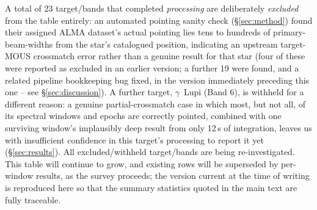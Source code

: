 \documentclass{openjournal}
\begin{document}
A total of 23 target/bands that completed \emph{processing} are
deliberately \emph{excluded} from the table entirely: an automated
pointing sanity check (\S\ref{sec:method}) found their assigned ALMA
dataset's actual pointing lies tens to hundreds of primary-beam-widths
from the star's catalogued position, indicating an upstream target-MOUS
crossmatch error rather than a genuine result for that star (four of
these were reported as excluded in an earlier version; a further 19
were found, and a related pipeline bookkeeping bug fixed, in the version
immediately preceding this one -- see \S\ref{sec:discussion}). A further
target, $\gamma$~Lupi (Band 6), is withheld for a different reason: a
genuine partial-crossmatch case in which most, but not all, of its
spectral windows and epochs are correctly pointed, combined with one
surviving window's implausibly deep result from only 12\,s of
integration, leaves us with insufficient confidence in this target's
processing to report it yet (\S\ref{sec:results}). All excluded/withheld
target/bands are being re-investigated. This table will continue to
grow, and existing rows will be superseded by per-window results, as the
survey proceeds; the version current at the time of writing is
reproduced here so that the summary statistics quoted in the main text
are fully traceable.
\end{document}
